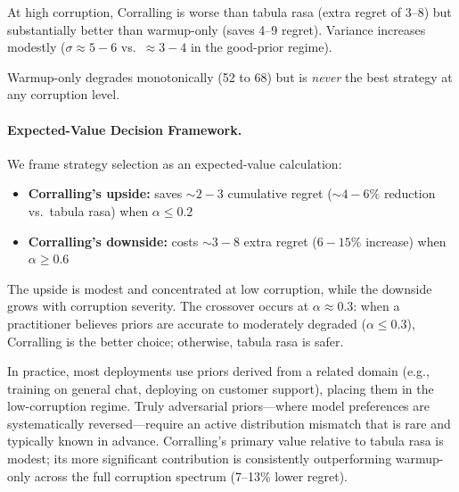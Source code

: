 At high corruption, Corralling is worse than tabula rasa (extra
regret of 3--8) but substantially better than warmup-only (saves
4--9 regret).  Variance increases modestly ($\sigma{\approx}5{-}6$
vs.\ ${\approx}3{-}4$ in the good-prior regime).

Warmup-only degrades monotonically (52 to 68) but is \emph{never}
the best strategy at any corruption level.

\paragraph{Expected-Value Decision Framework.}
We frame strategy selection as an expected-value calculation:
\begin{itemize}[nosep]
    \item \textbf{Corralling's upside:} saves ${\sim}2{-}3$ cumulative
          regret (${\sim}4{-}6\%$ reduction vs.\ tabula rasa) when
          $\alpha \leq 0.2$
    \item \textbf{Corralling's downside:} costs ${\sim}3{-}8$ extra
          regret ($6{-}15\%$ increase) when $\alpha \geq 0.6$
\end{itemize}

The upside is modest and concentrated at low corruption, while the
downside grows with corruption severity.  The crossover occurs at
$\alpha{\approx}0.3$: when a practitioner believes priors are accurate
to moderately degraded ($\alpha \leq 0.3$), Corralling is the better
choice; otherwise, tabula rasa is safer.

In practice, most deployments use priors derived from a related domain
(e.g., training on general chat, deploying on customer support),
placing them in the low-corruption regime.  Truly adversarial
priors---where model preferences are systematically reversed---require
an active distribution mismatch that is rare and typically known in
advance.  Corralling's primary value relative to tabula rasa is
modest; its more significant contribution is consistently outperforming
warmup-only across the full corruption spectrum (7--13\% lower regret).

